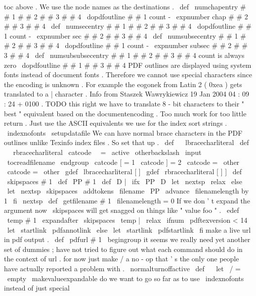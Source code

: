 {{toc
above
.
%
%
We
use
the
node
names
as
the
destinations
.
\
def
\
numchapentry
#
#
1
#
#
2
#
#
3
#
#
4
{
%
\
dopdfoutline
{
#
#
1
}
{
count
-
\
expnumber
{
chap
#
#
2
}
}
{
#
#
3
}
{
#
#
4
}
}
%
\
def
\
numsecentry
#
#
1
#
#
2
#
#
3
#
#
4
{
%
\
dopdfoutline
{
#
#
1
}
{
count
-
\
expnumber
{
sec
#
#
2
}
}
{
#
#
3
}
{
#
#
4
}
}
%
\
def
\
numsubsecentry
#
#
1
#
#
2
#
#
3
#
#
4
{
%
\
dopdfoutline
{
#
#
1
}
{
count
-
\
expnumber
{
subsec
#
#
2
}
}
{
#
#
3
}
{
#
#
4
}
}
%
\
def
\
numsubsubsecentry
#
#
1
#
#
2
#
#
3
#
#
4
{
%
count
is
always
zero
\
dopdfoutline
{
#
#
1
}
{
}
{
#
#
3
}
{
#
#
4
}
}
%
%
%
PDF
outlines
are
displayed
using
system
fonts
instead
of
%
document
fonts
.
Therefore
we
cannot
use
special
characters
%
since
the
encoding
is
unknown
.
For
example
the
eogonek
from
%
Latin
2
(
0xea
)
gets
translated
to
a
|
character
.
Info
from
%
Staszek
Wawrykiewicz
19
Jan
2004
04
:
09
:
24
+
0100
.
%
%
TODO
this
right
we
have
to
translate
8
-
bit
characters
to
%
their
"
best
"
equivalent
based
on
the
documentencoding
.
Too
%
much
work
for
too
little
return
.
Just
use
the
ASCII
equivalents
%
we
use
for
the
index
sort
strings
.
%
\
indexnofonts
\
setupdatafile
%
We
can
have
normal
brace
characters
in
the
PDF
outlines
unlike
%
Texinfo
index
files
.
So
set
that
up
.
\
def
\
{
{
\
lbracecharliteral
}
%
\
def
\
}
{
\
rbracecharliteral
}
%
\
catcode
\
\
=
\
active
\
otherbackslash
\
input
\
tocreadfilename
\
endgroup
}
{
\
catcode
[
=
1
\
catcode
]
=
2
\
catcode
{
=
\
other
\
catcode
}
=
\
other
\
gdef
\
lbracecharliteral
[
{
]
%
\
gdef
\
rbracecharliteral
[
}
]
%
]
%
\
def
\
skipspaces
#
1
{
\
def
\
PP
{
#
1
}
\
def
\
D
{
|
}
%
\
ifx
\
PP
\
D
\
let
\
nextsp
\
relax
\
else
\
let
\
nextsp
\
skipspaces
\
addtokens
{
\
filename
}
{
\
PP
}
%
\
advance
\
filenamelength
by
1
\
fi
\
nextsp
}
\
def
\
getfilename
#
1
{
%
\
filenamelength
=
0
%
If
we
don
'
t
expand
the
argument
now
\
skipspaces
will
get
%
snagged
on
things
like
"
value
{
foo
}
"
.
\
edef
\
temp
{
#
1
}
%
\
expandafter
\
skipspaces
\
temp
|
\
relax
}
\
ifnum
\
pdftexversion
<
14
\
let
\
startlink
\
pdfannotlink
\
else
\
let
\
startlink
\
pdfstartlink
\
fi
%
make
a
live
url
in
pdf
output
.
\
def
\
pdfurl
#
1
{
%
\
begingroup
%
it
seems
we
really
need
yet
another
set
of
dummies
;
have
not
%
tried
to
figure
out
what
each
command
should
do
in
the
context
%
of
url
.
for
now
just
make
/
a
no
-
op
that
'
s
the
only
one
%
people
have
actually
reported
a
problem
with
.
%
\
normalturnoffactive
\
def
\
{
}
%
\
let
\
/
=
\
empty
\
makevalueexpandable
%
do
we
want
to
go
so
far
as
to
use
\
indexnofonts
instead
of
just
%
special
}}}
